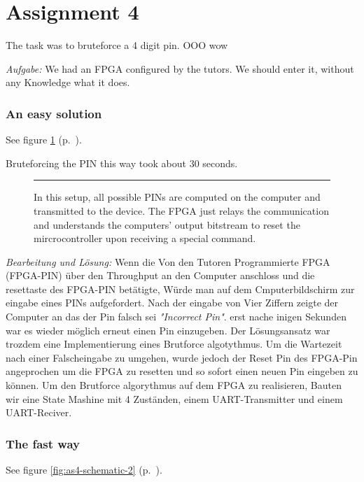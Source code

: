 \section*{Assignment 4}
The task was to bruteforce a 4 digit pin. OOO wow

\emph{Aufgabe: }We had an FPGA configured by the tutors. We should enter it, without any Knowledge what it does.

\subsubsection*{An easy solution}
See figure \ref{fig:as4-schematic-1} (p.~\pageref{fig:as4-schematic-1}).

Bruteforcing the PIN this way took about 30 seconds.

\begin{figure}[tb]
    \begin{center}
        
        \caption{In this setup, all possible PINs are computed on the computer and transmitted to the device. The FPGA just relays the communication and understands the computers' output bitstream to reset the mircrocontroller upon receiving a special command.}
        \label{fig:as4-schematic-1}
        \vspace{1em}\hrule
    \end{center}
\end{figure}

\emph{Bearbeitung und Lösung: }Wenn die Von den Tutoren Programmierte FPGA (FPGA-PIN) über den Throughput an den Computer anschloss und die resettaste des FPGA-PIN betätigte, Würde man auf dem Cmputerbildschirm zur eingabe eines PINs aufgefordert. Nach der eingabe von Vier Ziffern zeigte der Computer an das der Pin falsch sei \emph{"Incorrect Pin"}. erst nache inigen Sekunden war es wieder möglich erneut einen Pin einzugeben. 
Der Lösungsansatz war trozdem eine Implementierung eines Brutforce algotythmus. Um die Wartezeit nach einer Falscheingabe zu umgehen, wurde jedoch der Reset Pin des FPGA-Pin angeprochen um die FPGA zu resetten und so sofort einen neuen Pin eingeben zu können. 
Um den Brutforce algorythmus auf dem FPGA zu realisieren, Bauten wir eine State Mashine mit 4 Zuständen, einem UART-Transmitter und einem UART-Reciver.

\subsubsection*{The fast way}
See figure \ref{fig:as4-schematic-2} (p.~\pageref{fig:as4-schematic-2}).

